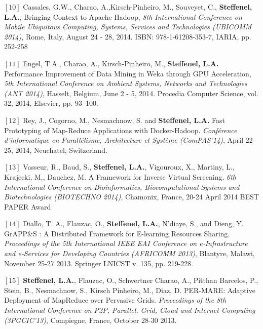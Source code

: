 \documentclass[final,twoside]{hdr} %
\begin{document}
\vspace{1em} \noindent $[10]$
Cassales, G.W., Charao, A.,Kirsch-Pinheiro, M., Souveyet, C., {\bf Steffenel, L.A.}, {Bringing Context to Apache Hadoop}, {\em 8th International Conference on Mobile Ubiquitous Computing, Systems, Services and Technologies (UBICOMM 2014)}, Rome, Italy, August 24 - 28, 2014. ISBN: 978-1-61208-353-7, IARIA, pp. 252-258 

\vspace{1em} \noindent $[11]$
Engel, T.A., Charao, A., Kirsch-Pinheiro, M., {\bf Steffenel, L.A.} {Performance Improvement of Data Mining in Weka through GPU Acceleration}, {\em 5th International Conference on Ambient Systems, Networks and Technologies (ANT 2014)}, Hasselt, Belgium, June 2 - 5, 2014. Procedia Computer Science, vol. 32, 2014, Elsevier, pp. 93–100.  

\vspace{1em} \noindent $[12]$
Rey, J., Cogorno, M., Nesmachnow, S. and {\bf Steffenel, L.A.} {Fast Prototyping of Map-Reduce Applications with Docker-Hadoop}. {\em Conférence d’informatique en Parallélisme, Architecture et Système (ComPAS'14)}, April 22-25, 2014, Neuchatel, Switzerland.

\vspace{1em} \noindent $[13]$
Vasseur, R., Baud, S., {\bf Steffenel, L.A.}, Vigouroux, X., Martiny, L., Krajecki, M., Dauchez, M. {A Framework for Inverse Virtual Screening}. {\em 6th International Conference on Bioinformatics, Biocomputational Systems and Biotechnologies (BIOTECHNO 2014)}, Chamonix, France, 20-24 April 2014 BEST PAPER Award

\vspace{1em} \noindent $[14]$
Diallo, T. A., Flauzac, O., {\bf Steffenel, L.A.}, N’diaye, S., and Dieng, Y. {GrAPP\&S : A Distributed Framework for E-learning Resources Sharing}. {\em Proceedings of the 5th International IEEE EAI Conference on e‐Infrastructure and e‐Services for Developing Countries (AFRICOMM 2013)}, Blantyre, Malawi, November 25-27 2013.  Springer LNICST v. 135, pp. 219-228. 

\vspace{1em} \noindent $[15]$
{\bf Steffenel, L.A.}, Flauzac, O., Schwertner Charao, A., Pitthan Barcelos, P., Stein, B., Nesmachnow, S., Kirsch Pinheiro, M., Diaz, D. {PER-MARE: Adaptive Deployment of MapReduce over Pervasive Grids}. {\em Proceedings of the 8th International Conference on P2P, Parallel, Grid, Cloud and Internet Computing (3PGCIC'13)}, Compiegne, France, October 28-30 2013. 
\end{document}
